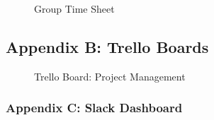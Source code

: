 \documentclass[12pt]{article} %
\begin{document}
	\begin{figure}[H] %
		\caption{Group Time Sheet}
		\label{fig:speciation}
	\end{figure}
	
	\newpage
	
	\subsection{Appendix B: Trello Boards}
	
	
	\begin{figure}[H] %
		\caption{Trello Board: Project Management}
		\label{fig:speciation}
	\end{figure}
	
	\newpage
	
	\subsubsection{Appendix C: Slack Dashboard}
	
\end{document}
